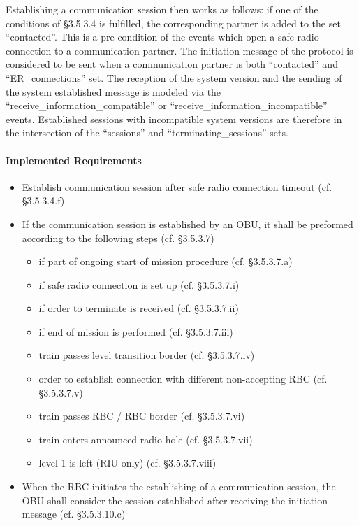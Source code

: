 \documentclass{template/openetcs_article}
\begin{document}
Establishing a communication session then works as follows: if one of the
conditions of §3.5.3.4 is fulfilled, the corresponding partner is added to the
set ``contacted''. This is a pre-condition of the events which open a safe radio
connection to a communication partner. The initiation message of the protocol is
considered to be sent when a communication partner is both ``contacted'' and
``ER\_connections'' set. The reception of the system version and the sending of
the system established message is modeled via the
``receive\_information\_compatible'' or ``receive\_information\_incompatible''
events. Established sessions with incompatible system versions are therefore in
the intersection of the ``sessions'' and ``terminating\_sessions'' sets.

\paragraph{Implemented Requirements}
\label{sec:impl-requ-4}

\begin{itemize}
\item Establish communication session after safe radio connection timeout
  (cf. §3.5.3.4.f)
\item If the communication session is established by an OBU, it shall be
  preformed according to the following steps (cf. §3.5.3.7)
  \begin{itemize}
  \item if part of ongoing start of mission procedure (cf. §3.5.3.7.a)
  \item if safe radio connection is set up (cf. §3.5.3.7.i)
  \item if order to terminate is received (cf. §3.5.3.7.ii)
  \item if end of mission is performed (cf. §3.5.3.7.iii)
  \item train passes level transition border (cf. §3.5.3.7.iv)
  \item order to establish connection with different non-accepting RBC
    (cf. §3.5.3.7.v)
  \item train passes RBC / RBC border (cf. §3.5.3.7.vi)
  \item train enters announced radio hole (cf. §3.5.3.7.vii)
  \item level 1 is left (RIU only) (cf. §3.5.3.7.viii)
  \end{itemize}
\item When the RBC initiates the establishing of a communication session, the
  OBU shall consider the session established after receiving the initiation
  message (cf. §3.5.3.10.c)
\end{itemize}





\end{document}
